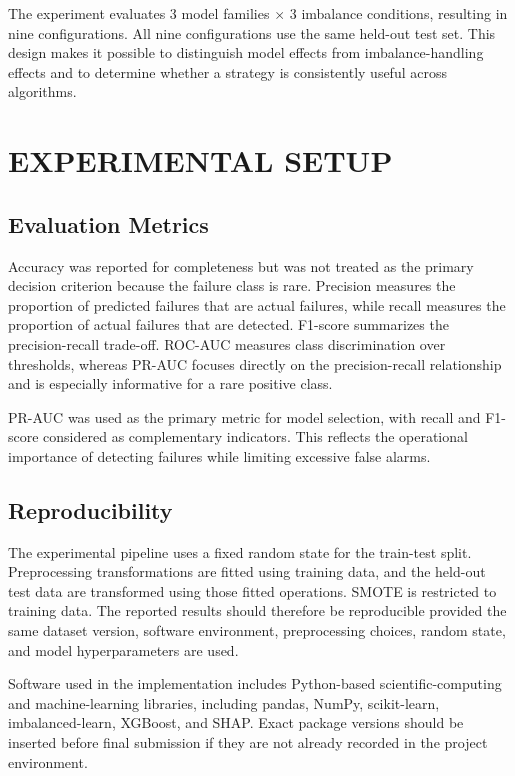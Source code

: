 \documentclass[conference]{IEEEtran}
\begin{document}
The experiment evaluates 3 model families $\times$ 3 imbalance conditions, resulting in nine configurations. All nine configurations use the same held-out test set. This design makes it possible to distinguish model effects from imbalance-handling effects and to determine whether a strategy is consistently useful across algorithms.

\section{EXPERIMENTAL SETUP}

\subsection{Evaluation Metrics}

Accuracy was reported for completeness but was not treated as the primary decision criterion because the failure class is rare. Precision measures the proportion of predicted failures that are actual failures, while recall measures the proportion of actual failures that are detected. F1-score summarizes the precision-recall trade-off. ROC-AUC measures class discrimination over thresholds, whereas PR-AUC focuses directly on the precision-recall relationship and is especially informative for a rare positive class.

PR-AUC was used as the primary metric for model selection, with recall and F1-score considered as complementary indicators. This reflects the operational importance of detecting failures while limiting excessive false alarms.

\subsection{Reproducibility}

The experimental pipeline uses a fixed random state for the train-test split. Preprocessing transformations are fitted using training data, and the held-out test data are transformed using those fitted operations. SMOTE is restricted to training data. The reported results should therefore be reproducible provided the same dataset version, software environment, preprocessing choices, random state, and model hyperparameters are used.

Software used in the implementation includes Python-based scientific-computing and machine-learning libraries, including pandas, NumPy, scikit-learn, imbalanced-learn, XGBoost, and SHAP. Exact package versions should be inserted before final submission if they are not already recorded in the project environment.
\end{document}
